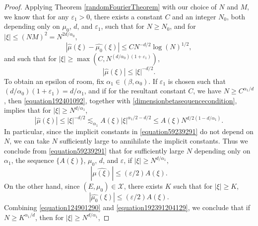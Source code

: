 \documentclass[12pt,reqno]{article}
\numberwithin{equation}{section}
\begin{document}
\begin{proof}
    Applying Theorem \ref{randomFourierTheorem} with our choice of $N$ and $M$, we know that for any $\varepsilon_1 > 0$, there exists a constant $C$ and an integer $N_0$, both depending only on $\mu_0$, $d$, and $\varepsilon_1$, such that for $N \geq N_0$, and for $|\xi| \leq (NM)^2 = N^{2d/\alpha_0}$,
    \begin{equation} \label{equation1092490129012}
        |\widehat{\mu}(\xi) - \widehat{\mu_0}(\xi)| \leq C N^{-d/2} \log(N)^{1/2},
    \end{equation}
    and such that for $|\xi| \geq \max \left(C,N^{(d/\alpha_0)(1 + \varepsilon_1)} \right)$,
    \begin{equation} \label{equation192401092}
        |\widehat{\mu}(\xi)| \leq |\xi|^{-d/2}.
    \end{equation}
    To obtain an epsilon of room, fix $\alpha_1 \in (\beta,\alpha_0)$. If $\varepsilon_1$ is chosen such that $(d/\alpha_0)(1 + \varepsilon_1) = d/\alpha_1$, and if for the resultant constant $C$, we have $N \geq C^{\alpha_1/d}$, then \eqref{equation192401092}, together with \eqref{dimensionbetasequencecondition}, implies that for $|\xi| \geq N^{d/\alpha_1}$,
    \begin{equation} \label{equation59239291}
        |\widehat{\mu}(\xi)| \leq |\xi|^{-d/2} \lesssim_{\alpha_1} A(\xi) |\xi|^{\alpha_1/2-d/2} \leq A(\xi) N^{d/2(1 - d/\alpha_1)}.
    \end{equation}
    In particular, since the implicit constants in \eqref{equation59239291} do not depend on $N$, we can take $N$ sufficiently large to annihilate the implicit constants. Thus we conclude from \eqref{equation59239291} that for sufficiently large $N$ depending only on $\alpha_1$, the sequence $ \{ A(\xi) \}$, $\mu_0$, $d$, and $\varepsilon$, if $|\xi| \geq N^{d/\alpha_1},$
    \begin{equation} \label{equation124901290}
        |\widehat{\mu(\xi)}| \leq (\varepsilon/2) A(\xi).
    \end{equation}
    On the other hand, since $(E,\mu_0) \in \mathcal{X}$, there exists $K$ such that for $|\xi| \geq K$,
    \begin{equation} \label{equation192391204129}
        |\widehat{\mu_0}(\xi)| \leq (\varepsilon/2) A(\xi).
    \end{equation}
    Combining \eqref{equation124901290} and \eqref{equation192391204129}, we conclude that if $N \geq K^{\alpha_1/d}$, then for $|\xi| \geq N^{d/\alpha_1}$,

\end{proof}
\end{document}
